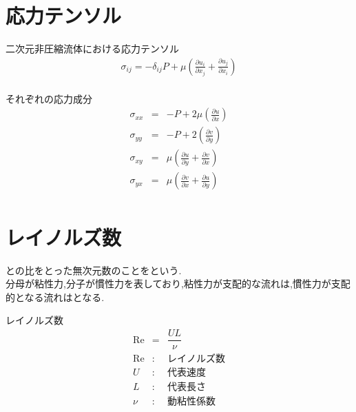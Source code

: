 \documentclass[a4paper]{jsarticle}
\begin{document}
\section{応力テンソル}
\begin{itembox}[l]{二次元非圧縮流体における応力テンソル}
    \begin{eqnarray*}
        \sigma_{ij}=-\delta_{ij}P+\mu\left(\frac{\partial u_i}{\partial x_j}+\frac{\partial u_j}{\partial x_i}\right)\\
    \end{eqnarray*}
\end{itembox}
\begin{itembox}[l]{それぞれの応力成分}
    \begin{eqnarray*}
        \sigma_{xx} &=& -P+2\mu\left(\frac{\partial u}{\partial x}\right)\\
        \sigma_{yy} &=& -P+2\left(\frac{\partial v}{\partial y}\right)\\
        \sigma_{xy} &=& \mu\left(\frac{\partial u}{\partial y}+\frac{\partial v}{\partial x}\right)\\
        \sigma_{yx} &=& \mu\left(\frac{\partial v}{\partial x}+\frac{\partial u}{\partial y}\right)\\
    \end{eqnarray*}
\end{itembox}
\section{レイノルズ数}
との比をとった無次元数のことをという.\\
分母が粘性力,分子が慣性力を表しており,粘性力が支配的な流れは,慣性力が支配的となる流れはとなる.\\
\begin{itembox}[l]{レイノルズ数}
    \begin{eqnarray*}
        \mathrm{Re}&=&\dfrac{UL}{\nu}\\
        \mathrm{Re} &:& レイノルズ数\\
        U &:& 代表速度\\
        L &:& 代表長さ\\
        \nu &:& 動粘性係数\\
    \end{eqnarray*}
\end{itembox}
\end{document}
